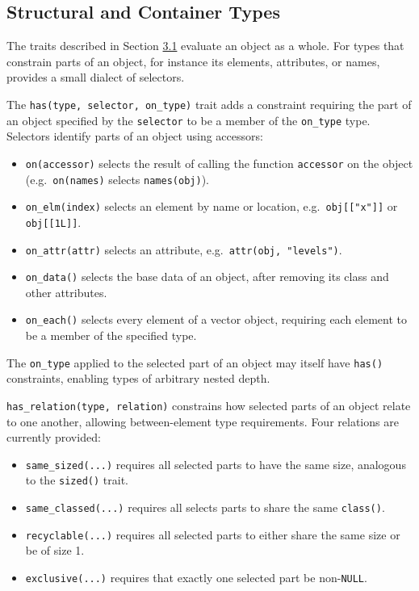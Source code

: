 \subsection{Structural and Container Types}\label{sec-structural-type}

The traits described in Section \hyperref[sec-type-membership]{3.1} evaluate an object as a whole. For types that constrain parts of an object, for instance its elements, attributes, or names,  provides a small dialect of selectors.

The \texttt{has(type,\ selector,\ on\_type)} trait adds a constraint requiring the part of an object specified by the \texttt{selector} to be a member of the \texttt{on\_type} type. Selectors identify parts of an object using accessors:

\begin{itemize}
\tightlist
\item
  \texttt{on(accessor)} selects the result of calling the function \texttt{accessor} on the object (e.g.~\texttt{on(names)} selects \texttt{names(obj)}).
\item
  \texttt{on\_elm(index)} selects an element by name or location, e.g.~\texttt{obj{[}{[}"x"{]}{]}} or \texttt{obj{[}{[}1L{]}{]}}.
\item
  \texttt{on\_attr(attr)} selects an attribute, e.g.~\texttt{attr(obj,\ "levels")}.
\item
  \texttt{on\_data()} selects the base data of an object, after removing its class and other attributes.
\item
  \texttt{on\_each()} selects every element of a vector object, requiring each element to be a member of the specified type.
\end{itemize}

The \texttt{on\_type} applied to the selected part of an object may itself have \texttt{has()} constraints, enabling types of arbitrary nested depth.

\texttt{has\_relation(type,\ relation)} constrains how selected parts of an object relate to one another, allowing between-element type requirements. Four relations are currently provided:

\begin{itemize}
\tightlist
\item
  \texttt{same\_sized(...)} requires all selected parts to have the same size, analogous to the \texttt{sized()} trait.
\item
  \texttt{same\_classed(...)} requires all selects parts to share the same \texttt{class()}.
\item
  \texttt{recyclable(...)} requires all selected parts to either share the same size or be of size 1.
\item
  \texttt{exclusive(...)} requires that exactly one selected part be non-\texttt{NULL}.
\end{itemize}

